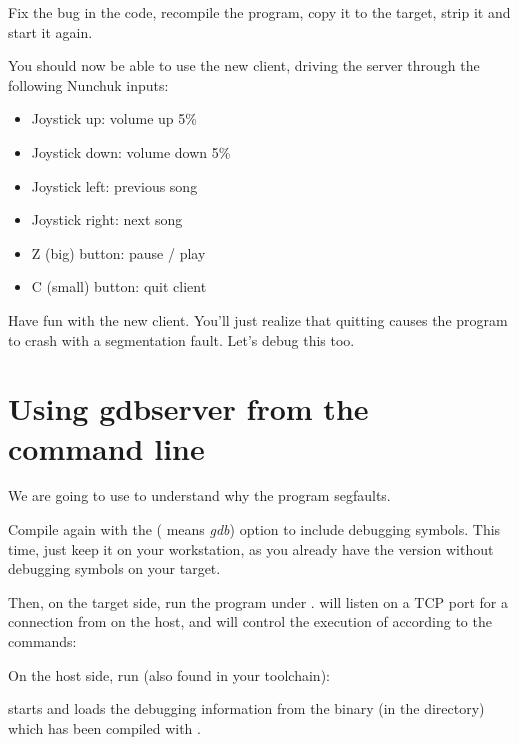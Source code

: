Fix the bug in the code, recompile the program, copy it to
the target, strip it and start it again.

You should now be able to use the new client, driving the server
through the following Nunchuk inputs:

\begin{itemize}
   \item Joystick up: volume up 5\%
   \item Joystick down: volume down 5\%
   \item Joystick left: previous song
   \item Joystick right: next song
   \item Z (big) button: pause / play
   \item C (small) button: quit client
\end{itemize}

Have fun with the new client. You'll just realize that quitting
causes the program to crash with a segmentation fault. Let's debug this
too.

\section{Using gdbserver from the command line}

We are going to use  to understand why the program
segfaults.

Compile  again with the  (
means {\em gdb}) option to include debugging symbols. This time, just
keep it on your workstation, as you already have the version without
debugging symbols on your target.

Then, on the target side, run the program under .
 will listen on a TCP port for a connection from
 on the host, and will control the execution of
 according to the  commands:


On the host side, run  (also found in your toolchain):
\begin{bashinput}
$ %
\end{bashinput}

 starts and loads the debugging information from the
 binary (in the  directory)
which has been compiled with .

